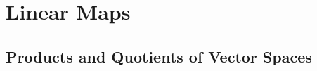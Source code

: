 \documentclass[nofonts,colorlinks]{tufte-handout}
\theoremstyle{plain} %
\newtheorem{cor}[thm]{Corollary}
\theoremstyle{definition}
\newtheorem{exer}[thm]{Exercise}
\theoremstyle{remark}
\newcommand{\bra}[1]{\mathopen{}\left(#1\right)}
\newcommand{\rest}[2]{\mathopen{}\left.#1\right|_{#2}}
\renewcommand{\phi}{\varphi}
\newcommand{\F}{\mathbf{F}}
\renewcommand{\L}{\mathcal{L}}
\DeclareMathOperator{\rank}{rank}
\begin{document}
\section{Linear Maps}



\subsection{Products and Quotients of Vector Spaces}
\end{document}

